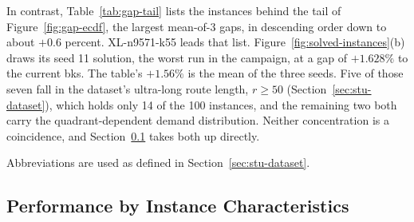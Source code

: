 In contrast, Table~\ref{tab:gap-tail} lists the instances behind the tail of
Figure~\ref{fig:gap-ecdf}, the largest mean-of-3 gaps, in descending order down to about $+0.6$
percent. XL-n9571-k55 leads that list. Figure~\ref{fig:solved-instances}(b) draws its seed 11 solution, the worst run in the campaign, at a gap of $+1.628\%$ to the current \gls{bks}. The table's $+1.56\%$ is the mean of the three seeds. Five of those seven fall in the dataset's ultra-long route length,
$r \geq 50$ (Section~\ref{sec:stu-dataset}), which holds only 14 of the 100
instances, and the remaining two both carry the quadrant-dependent demand
distribution. Neither concentration is a coincidence, and
Section~\ref{sec:stu-characteristics} takes both up directly.

\begin{table}[H]
\centering
\caption{\gls{drispi}'s Largest Mean-of-3 Gap to Current \gls{bks}.}
\label{tab:gap-tail}

\medskip
\begin{minipage}{\linewidth}
  \footnotesize
  Abbreviations are used as defined in Section~\ref{sec:stu-dataset}.
\end{minipage}
\end{table}
\vspace{-\intextsep}

\subsection{Performance by Instance Characteristics}
\label{sec:stu-characteristics}

